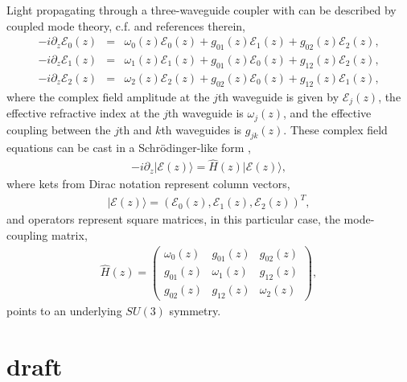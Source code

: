 \documentclass[9pt,twocolumn,twoside]{osajnl}
\begin{document}
Light propagating through a three-waveguide coupler with can be described by coupled mode theory, c.f. \cite{RodriguezLara2015p068014} and references therein,
\begin{eqnarray}
-i \partial_{z} \mathcal{E}_{0}(z) &=& \omega_{0}(z) \mathcal{E}_{0}(z) +   g_{01}(z) \mathcal{E}_{1}(z) + g_{02}(z) \mathcal{E}_{2}(z), \\
 -i \partial_{z} \mathcal{E}_{1}(z) &=& \omega_{1}(z) \mathcal{E}_{1}(z) + g_{01}(z) \mathcal{E}_{0}(z) + g_{12}(z) \mathcal{E}_{2}(z), \\
 -i \partial_{z} \mathcal{E}_{2}(z) &=& \omega_{2}(z) \mathcal{E}_{2}(z) + g_{02}(z) \mathcal{E}_{0}(z) + g_{12}(z) \mathcal{E}_{1}(z),
\end{eqnarray}
where the complex field amplitude at the $j$th waveguide is given by $\mathcal{E}_{j}(z)$, the effective refractive index at the $j$th waveguide is $\omega_{j}(z)$, and the effective coupling between the $j$th and $k$th waveguides is $g_{jk}(z)$.
These complex field equations can be cast in a Schr\"odinger-like form \cite{RodriguezLara2015p068014},
\begin{eqnarray}
- i \partial_{z} \vert \mathcal{E}(z) \rangle = \hat{H}(z) \vert \mathcal{E}(z) \rangle,\label{eq:diff}
\end{eqnarray}
where kets from Dirac notation represent column vectors,
\begin{eqnarray}
\vert \mathcal{E}(z) \rangle = \left( \mathcal{E}_{0}(z), \mathcal{E}_{1}(z), \mathcal{E}_{2}(z) \right)^{T}, 
\end{eqnarray}
and operators represent square matrices, in this particular case, the mode-coupling matrix,
\begin{eqnarray}
\hat{H}(z) = \left( \begin{array}{ccc} 
\omega_{0}(z)  & g_{01}(z) & g_{02}(z) \\
g_{01}(z) & \omega_{1}(z) & g_{12}(z) \\
g_{02}(z) & g_{12}(z) & \omega_{2}(z)
\end{array} \right), \label{eq:hmlt}
\end{eqnarray}
points to an underlying $SU(3)$ symmetry.


\section{draft}
\end{document}
